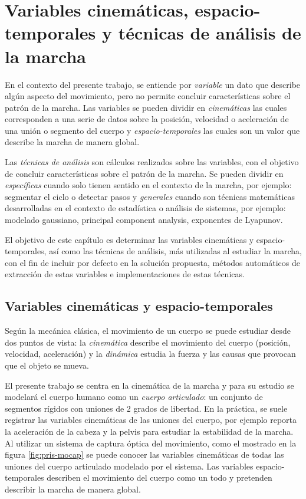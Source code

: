 \chapter[Variables y técnicas]{Variables cinemáticas, espacio-temporales y técnicas de análisis de la marcha}

En el contexto del presente trabajo, se entiende por \emph{variable} un dato que describe algún aspecto del movimiento, pero no permite concluir características sobre el patrón de la marcha. Las variables se pueden dividir en \emph{cinemáticas} las cuales corresponden a una serie de datos sobre la posición, velocidad o aceleración de una unión o segmento del cuerpo y \emph{espacio-temporales} las cuales son un valor que describe la marcha de manera global. 

Las \emph{técnicas de análisis} son cálculos realizados sobre las variables, con el objetivo de concluir características sobre el patrón de la marcha. Se pueden dividir en \emph{específicas} cuando solo tienen sentido en el contexto de la marcha, por ejemplo: segmentar el ciclo o detectar pasos y \emph{generales} cuando son técnicas matemáticas desarrolladas en el contexto de estadística o análisis de sistemas, por ejemplo: modelado gaussiano, principal component analysis, exponentes de Lyapunov.


El objetivo de este capítulo es determinar las variables cinemáticas y espacio-temporales, así como las técnicas de análisis, más utilizadas al estudiar la marcha, con el fin de incluir por defecto en la solución propuesta, métodos automáticos de extracción de estas variables e implementaciones de estas técnicas. 

\section[Variables]{Variables cinemáticas y espacio-temporales}

Según la mecánica clásica, el movimiento de un cuerpo se puede estudiar desde dos puntos de vista: la \emph{cinemática} describe el movimiento del cuerpo (posición, velocidad, aceleración) y la \emph{dinámica} estudia la fuerza y las causas que provocan que el objeto se mueva. \citep{giancoli} 

El presente trabajo se centra en la cinemática de la marcha y para su estudio se modelará el cuerpo humano como un \emph{cuerpo articulado}: un conjunto de segmentos rígidos con uniones de 2 grados de libertad. En la práctica, se suele registrar las variables cinemáticas de las uniones del cuerpo, por ejemplo \cite{menz} reporta la aceleración de la cabeza y la pelvis para estudiar la estabilidad de la marcha. Al utilizar un sistema de captura óptica del movimiento, como el mostrado en la figura \ref{fig:pris-mocap} se puede conocer las variables cinemáticas de todas las uniones del cuerpo articulado modelado por el sistema. Las variables espacio-temporales describen el movimiento del cuerpo como un todo y pretenden describir la marcha de manera global. 

